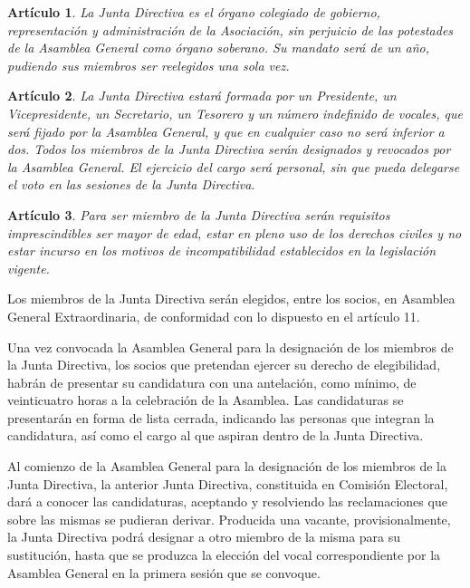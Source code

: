 \documentclass[a4paper,12pt]{article}
\theoremstyle{mystyle}		%
\newtheorem{art}{Artículo}	%
\begin{document}
\begin{onehalfspace}
\begin{art}
La Junta Directiva es el órgano colegiado de gobierno, representación y administración de la Asociación, sin perjuicio de las potestades de la Asamblea General como órgano soberano. Su mandato será de un año, pudiendo sus miembros ser reelegidos una sola vez.
\end{art}

\begin{art}
La Junta Directiva estará formada por un Presidente, un Vicepresidente, un Secretario, un Tesorero y un número indefinido de vocales, que será fijado por la Asamblea General, y que en cualquier caso no será inferior a dos. Todos los miembros de la Junta Directiva serán designados y revocados por la Asamblea General. El ejercicio del cargo será personal, sin que pueda delegarse el voto en las sesiones de la Junta Directiva.
\end{art}

\begin{art}
Para ser miembro de la Junta Directiva serán requisitos imprescindibles ser mayor de edad, estar en pleno uso de los derechos civiles y no estar incurso en los motivos de incompatibilidad establecidos en la legislación vigente.
\end{art}

Los miembros de la Junta Directiva serán elegidos, entre los socios, en Asamblea General Extraordinaria, de conformidad con lo dispuesto en el artículo 11.

Una vez convocada la Asamblea General para la designación de los miembros de la Junta Directiva, los socios que pretendan ejercer su derecho de elegibilidad, habrán de presentar su candidatura con una antelación, como mínimo, de veinticuatro horas a la celebración de la Asamblea. Las candidaturas se presentarán en forma de lista cerrada, indicando las personas que integran la candidatura, así como el cargo al que aspiran dentro de la Junta Directiva.

Al comienzo de la Asamblea General para la designación de los miembros de la Junta Directiva, la anterior Junta Directiva, constituida en Comisión Electoral, dará a conocer las candidaturas, aceptando y resolviendo las reclamaciones que sobre las mismas se pudieran derivar. Producida una vacante, provisionalmente, la Junta Directiva podrá designar a otro miembro de la misma para su sustitución, hasta que se produzca la elección del vocal correspondiente por la Asamblea General en la primera sesión que se convoque.


\end{onehalfspace}
\end{document}
